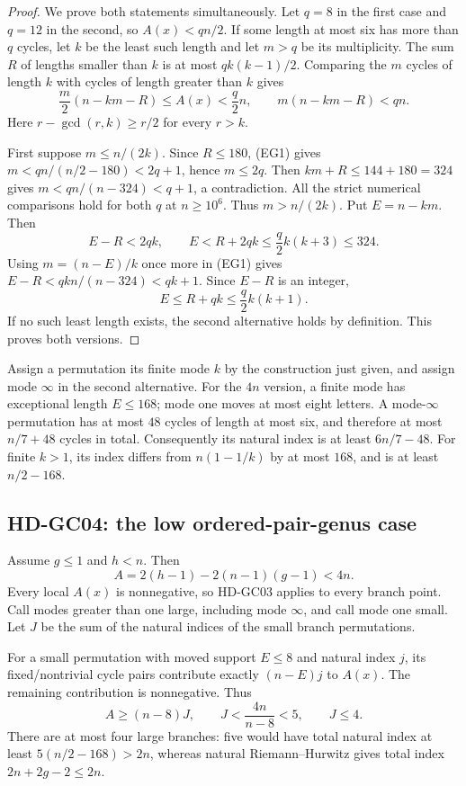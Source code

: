 \begin{proof}
We prove both statements simultaneously. Let $q=8$ in the first
case and $q=12$ in the second, so $A(x)<qn/2$. If some length at
most six has more than $q$ cycles, let $k$ be the least such length
and let $m>q$ be its multiplicity. The sum $R$ of lengths smaller
than $k$ is at most $qk(k-1)/2$. Comparing the $m$ cycles of length
$k$ with cycles of length greater than $k$ gives
\[
       \frac m2(n-km-R)\leq A(x)<\frac q2 n,
       \qquad m(n-km-R)<qn.                         \tag{EG1}
\]
Here $r-\gcd(r,k)\geq r/2$ for every $r>k$.

First suppose $m\leq n/(2k)$. Since $R\leq180$, (EG1) gives
$m<qn/(n/2-180)<2q+1$, hence $m\leq2q$. Then
$km+R\leq144+180=324$ gives
$m<qn/(n-324)<q+1$, a contradiction. All the strict numerical
comparisons hold for both $q$ at $n\geq10^6$.
Thus $m>n/(2k)$. Put $E=n-km$. Then
\[
 E-R<2qk,\qquad
 E<R+2qk\leq\frac q2 k(k+3)\leq324.
\]
Using $m=(n-E)/k$ once more in (EG1) gives
$E-R<qkn/(n-324)<qk+1$. Since $E-R$ is an integer,
\[
             E\leq R+qk\leq\frac q2 k(k+1).
\]
If no such least length exists, the second alternative holds by
definition. This proves both versions.
\end{proof}

Assign a permutation its finite mode $k$ by the construction just
given, and assign mode $\infty$ in the second alternative. For the
$4n$ version, a finite mode has exceptional length $E\leq168$;
mode one moves at most eight letters. A mode-$\infty$ permutation
has at most $48$ cycles of length at most six, and therefore at most
$n/7+48$ cycles in total. Consequently its natural index is at least
$6n/7-48$. For finite $k>1$, its index differs from $n(1-1/k)$ by
at most $168$, and is at least $n/2-168$.

\subsection*{HD-GC04: the low ordered-pair-genus case}

Assume $g\leq1$ and $h<n$. Then
\[
        A=2(h-1)-2(n-1)(g-1)<4n.                    \tag{EG2}
\]
Every local $A(x)$ is nonnegative, so HD-GC03 applies to every
branch point. Call modes greater than one large, including mode
$\infty$, and call mode one small. Let $J$ be the sum of the natural
indices of the small branch permutations.

For a small permutation with moved support $E\leq8$ and natural
index $j$, its fixed/nontrivial cycle pairs contribute exactly
$(n-E)j$ to $A(x)$. The remaining contribution is nonnegative.
Thus
\[
       A\geq(n-8)J,\qquad J<\frac{4n}{n-8}<5,
       \qquad J\leq4.                              \tag{EG3}
\]
There are at most four large branches: five would have total natural
index at least $5(n/2-168)>2n$, whereas natural Riemann--Hurwitz gives
total index $2n+2g-2\leq2n$.


